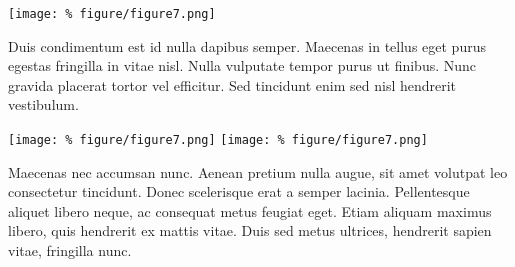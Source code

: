 \documentclass[unknownkeysallowed,usepdftitle=false, parskip=full]{beamer}
\newcommand{\secvariable}{nothing}
\newcommand{\mysection}[1]{\renewcommand{\secvariable}{#1}
}
\begin{document}
\mysection{minor}
\begin{frame}\label{\secvariable} %
\begin{center}
\texttt{[image: \%
figure/figure7.png]}
\end{center}
\vspace{-0.2cm}

Duis condimentum est id nulla dapibus semper. Maecenas in tellus eget purus egestas fringilla in vitae nisl. Nulla vulputate tempor purus ut finibus. Nunc gravida placerat tortor vel efficitur. Sed tincidunt enim sed nisl hendrerit vestibulum. 

\end{frame}


\begin{frame}\label{\secvariable}

%
\texttt{[image: \%
figure/figure7.png]}\hspace{.05\textwidth}
\texttt{[image: \%
figure/figure7.png]}

Maecenas nec accumsan nunc. Aenean pretium nulla augue, sit amet volutpat leo consectetur tincidunt. Donec scelerisque erat a semper lacinia. Pellentesque aliquet libero neque, ac consequat metus feugiat eget. Etiam aliquam maximus libero, quis hendrerit ex mattis vitae. Duis sed metus ultrices, hendrerit sapien vitae, fringilla nunc. 

\end{frame}
\end{document}
